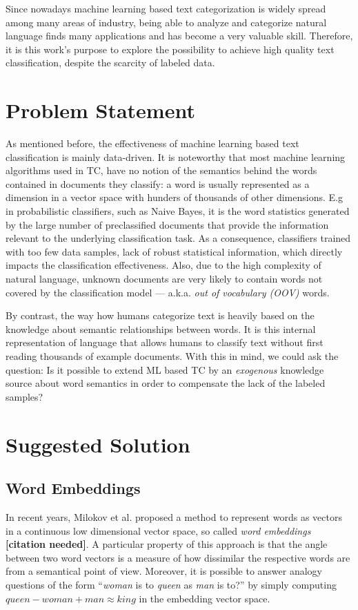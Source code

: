 Since nowadays machine learning based text categorization is widely spread
among many areas of industry, being able to analyze and categorize natural
language finds many applications and has become a very valuable skill. 
Therefore, it is this work's purpose to explore the possibility to achieve high
quality text classification, despite the scarcity of labeled data.

\section{Problem Statement}

As mentioned before, the effectiveness of machine learning based text
classification is mainly data-driven. It is noteworthy that most machine
learning algorithms used in TC, have no notion of the semantics behind the words
contained in documents they classify: a word is usually represented as a dimension
in a vector space with hunders of thousands of other dimensions. E.g in
probabilistic classifiers, such as Naive Bayes, it is the word statistics
generated by the large number of preclassified documents that provide the information relevant to the
underlying classification task.
As a consequence, classifiers trained with too few data samples, lack of
robust statistical information, which directly impacts the classification
effectiveness. Also, due to the high complexity of natural language,
unknown documents are very likely to contain words not covered by the
classification model --- a.k.a. \emph{out of vocabulary (OOV)} words.

By contrast, the way how humans categorize text is heavily based on the
knowledge about semantic relationships between words. It is this internal representation
of language that allows humans to classify text without first reading thousands of example documents. 
With this in mind, we could ask the question:  Is it possible to extend ML
based TC by an \emph{exogenous} knowledge source about word semantics in order
to compensate the lack of the labeled samples?

\section{Suggested Solution}

\subsection{Word Embeddings}
In recent years, Milokov et al. proposed a method to represent words as vectors
in a continuous low dimensional vector space, so
called \emph{word embeddings} \textbf{[citation needed]}.
A particular property of this approach is that the angle between two word
vectors is a measure of how dissimilar the respective words are from a
semantical point of view.
Moreover, it is possible to answer analogy questions of the form ``\emph{woman} is to
 \emph{queen} as \emph{man} is to?'' by simply computing $\mathit{queen} - \mathit{woman} +
\mathit{man} \approx \mathit{king}$ in the embedding vector space. 

